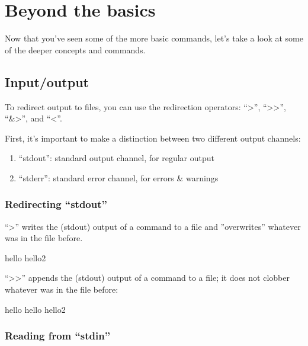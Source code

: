 \chapter{Beyond the basics}

Now that you've seen some of the more basic commands, let's take a look at some
of the deeper concepts and commands.

\section{Input/output}

To redirect output to files, you can use the redirection operators: ``>'',
``>>'', ``\&>'', and ``<''.

First, it's important to make a distinction between two different output
channels:

\begin{enumerate}
 \item ``stdout'': standard output channel, for regular output
 \item ``stderr'': standard error channel, for errors \& warnings
\end{enumerate}

\subsection{Redirecting ``stdout''}

``>'' writes the (stdout) output of a command to a file and ''overwrites''
whatever was in the file before.

\begin{prompt}
hello
hello2
\end{prompt}

``>>'' appends the (stdout) output of a command to a file; it does not clobber
whatever was in the file before:

\begin{prompt}
hello
hello
hello2
\end{prompt}

\subsection{Reading from ``stdin''}

